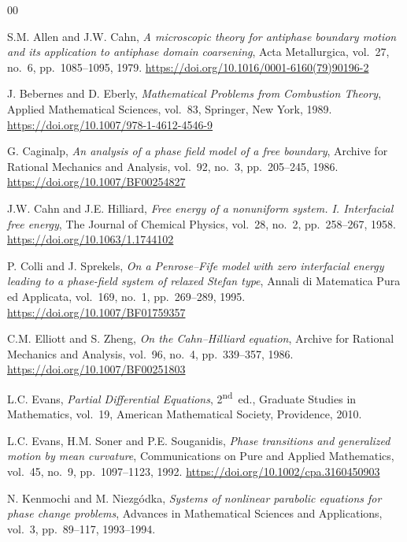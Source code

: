 \documentclass[final,1p,times]{elsarticle}
\numberwithin{equation}{section}
\begin{document}
\begin{thebibliography}{00}
	
	S.M. Allen and J.W. Cahn,
	\textit{A microscopic theory for antiphase boundary motion and its application
		to antiphase domain coarsening},
	Acta Metallurgica, vol.~27, no.~6, pp.~1085--1095, 1979.
	\newblock \url{https://doi.org/10.1016/0001-6160(79)90196-2}
	
	J. Bebernes and D. Eberly,
	\textit{Mathematical Problems from Combustion Theory},
	Applied Mathematical Sciences, vol.~83, Springer, New York, 1989.
	\newblock \url{https://doi.org/10.1007/978-1-4612-4546-9}
	
	G. Caginalp,
	\textit{An analysis of a phase field model of a free boundary},
	Archive for Rational Mechanics and Analysis, vol.~92, no.~3,
	pp.~205--245, 1986.
	\newblock \url{https://doi.org/10.1007/BF00254827}
	
	J.W. Cahn and J.E. Hilliard,
	\textit{Free energy of a nonuniform system. I. Interfacial free energy},
	The Journal of Chemical Physics, vol.~28, no.~2, pp.~258--267, 1958.
	\newblock \url{https://doi.org/10.1063/1.1744102}
	
	P. Colli and J. Sprekels,
	\textit{On a Penrose--Fife model with zero interfacial energy leading to a
		phase-field system of relaxed Stefan type},
	Annali di Matematica Pura ed Applicata, vol.~169, no.~1,
	pp.~269--289, 1995.
	\newblock \url{https://doi.org/10.1007/BF01759357}
	
	C.M. Elliott and S. Zheng,
	\textit{On the Cahn--Hilliard equation},
	Archive for Rational Mechanics and Analysis, vol.~96, no.~4,
	pp.~339--357, 1986.
	\newblock \url{https://doi.org/10.1007/BF00251803}
	
	L.C. Evans,
	\textit{Partial Differential Equations},
	2\textsuperscript{nd}~ed., Graduate Studies in Mathematics, vol.~19,
	American Mathematical Society, Providence, 2010.
	
	L.C. Evans, H.M. Soner and P.E. Souganidis,
	\textit{Phase transitions and generalized motion by mean curvature},
	Communications on Pure and Applied Mathematics, vol.~45, no.~9,
	pp.~1097--1123, 1992.
	\newblock \url{https://doi.org/10.1002/cpa.3160450903}
	
	N. Kenmochi and M. Niezg\'odka,
	\textit{Systems of nonlinear parabolic equations for phase change problems},
	Advances in Mathematical Sciences and Applications, vol.~3,
	pp.~89--117, 1993--1994.
	

\end{thebibliography}
\end{document}
